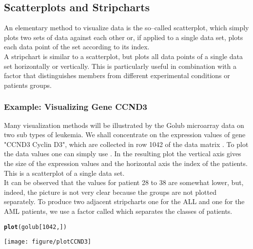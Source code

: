 \documentclass{article}\usepackage[]{graphicx}\usepackage[usenames,dvipsnames]{color}
\makeatletter
\def\maxwidth{ %
  \ifdim\Gin@nat@width>\linewidth
    \linewidth
  \else
    \Gin@nat@width
  \fi
}
\newcommand{\hlnum}[1]{\textcolor[rgb]{0.686,0.059,0.569}{#1}}%
\newcommand{\hlstd}[1]{\textcolor[rgb]{0.345,0.345,0.345}{#1}}%
\newcommand{\hlkwd}[1]{\textcolor[rgb]{0.737,0.353,0.396}{\textbf{#1}}}%
\newenvironment{kframe}{%
 \def\at@end@of@kframe{}%
 \ifinner\ifhmode%
  \def\at@end@of@kframe{\end{minipage}}%
  \begin{minipage}{\columnwidth}%
 \fi\fi%
 \def\FrameCommand##1{\hskip\@totalleftmargin \hskip-\fboxsep
 \colorbox{shadecolor}{##1}\hskip-\fboxsep
     \hskip-\linewidth \hskip-\@totalleftmargin \hskip\columnwidth}%
 \MakeFramed {\advance\hsize-\width
   \@totalleftmargin\z@ \linewidth\hsize
   \@setminipage}}%
 {\par\unskip\endMakeFramed%
 \at@end@of@kframe}
\newenvironment{knitrout}{}{} %
\makeatother
\begin{document}
\subsection{Scatterplots and Stripcharts}
An elementary method to visualize data is the so--called scatterplot,
which simply plots two sets of data against each other or, if applied to a single
data set, plots each data point of the set according to its index. \\

A stripchart is similar to a scatterplot, but plots all data points of a single
data set horizontally or vertically. This is particularly useful in combination with a factor 
that distinguishes members from different experimental conditions or patients groups.


\subsubsection*{Example: Visualizing Gene CCND3} 
Many visualization methods will be illustrated by the Golub
 microarray data on two sub types of leukemia. We shall concentrate on the expression values of gene
"CCND3 Cyclin D3", which are collected in row 1042 of the data matrix
. To plot the data values one can simply use . In
the resulting plot  the vertical axis gives the size of the expression
values and the horizontal axis the index of the patients. This is a scatterplot 
of a single data set. \\

 It can be observed
that the values for patient 28 to 38 are somewhat lower, but, indeed, the
picture is not very clear because the groups are not plotted separately.
To produce two adjacent stripcharts one for the ALL and one for the
AML patients, we use a factor called   which
separates the classes of patients.

\begin{knitrout}
\color{fgcolor}\begin{kframe}
\begin{alltt}
\hlkwd{plot}\hlstd{(golub[}\hlnum{1042}\hlstd{,])}
\end{alltt}
\end{kframe}
\texttt{[image: figure/plotCCND3]} 

\end{knitrout}
\end{document}
